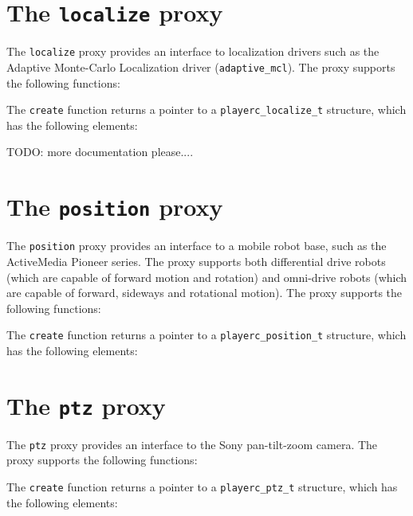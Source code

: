 \documentclass[11pt]{report}
\begin{document}
\newpage
\section{The {\tt localize} proxy}

The {\tt localize} proxy provides an interface to localization drivers
such as the Adaptive Monte-Carlo Localization driver ({\tt adaptive\_mcl}).
The proxy supports the following functions:
\begin{quote}

\end{quote}
The {\tt create} function returns a pointer to a {\tt playerc\_localize\_t}
structure, which has the following elements:
\begin{quote}

\end{quote}

TODO: more documentation please....


\newpage
\section{The {\tt position} proxy}

The {\tt position} proxy provides an interface to a mobile robot base,
such as the ActiveMedia Pioneer series.  The proxy supports both
differential drive robots (which are capable of forward motion and
rotation) and omni-drive robots (which are capable of forward,
sideways and rotational motion).  The proxy supports the following
functions:
\begin{quote}

\end{quote}
The {\tt create} function returns a pointer to a {\tt playerc\_position\_t}
structure, which has the following elements:
\begin{quote}

\end{quote}


\newpage
\section{The {\tt ptz} proxy}

The {\tt ptz} proxy provides an interface to the Sony pan-tilt-zoom
camera.  The proxy supports the following
functions:
\begin{quote}

\end{quote}
The {\tt create} function returns a pointer to a {\tt playerc\_ptz\_t}
structure, which has the following elements:
\begin{quote}

\end{quote}
\end{document}
